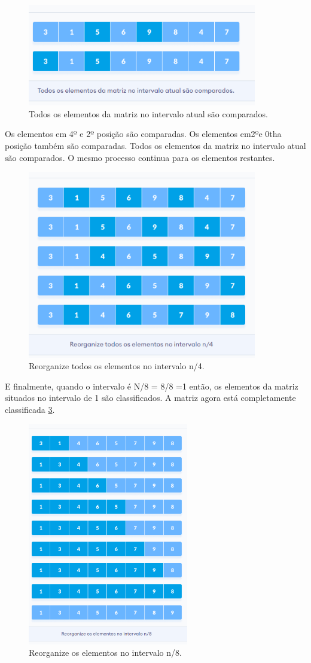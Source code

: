 \begin{figure}[h!]
    \centering
    \includegraphics[width = 10cm]{Imagens/Shell Sort/ex5.png}
    \caption{Todos os elementos da matriz no intervalo atual são comparados.}
    \label{fig:ex5}
\end{figure}

\par\newpage Os elementos em 4º e 2º posição são comparadas. Os elementos em2ºe 0tha posição também são comparadas. Todos os elementos da matriz no intervalo atual são comparados. O mesmo processo continua para os elementos restantes.

\begin{figure}[h!]
    \centering
    \includegraphics[width = 10cm]{Imagens/Shell Sort/ex6.png}
    \caption{Reorganize todos os elementos no intervalo n/4.}
    \label{fig:ex6}
\end{figure}

 \par E finalmente, quando o intervalo é N/8 = 8/8 =1 então, os elementos da matriz situados no intervalo de 1 são classificados. A matriz agora está completamente classificada \ref{fig:ex7}.

\begin{figure}[h!]
    \centering
    \includegraphics[width = 7cm]{Imagens/Shell Sort/ex7.png}
    \caption{Reorganize os elementos no intervalo n/8.}
    \label{fig:ex7}
\end{figure}
 

